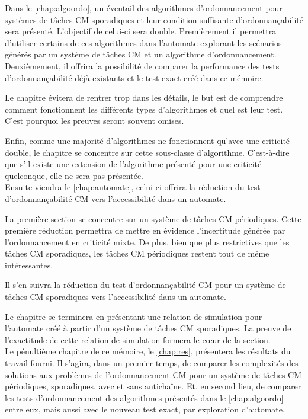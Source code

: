 \documentclass[12pt,a4paper,oneside]{book}
\theoremstyle{break}
\theoremstyle{breakplain}
\begin{document}
Dans le \autoref{chap:algoordo}, un éventail des algorithmes d'ordonnancement pour systèmes de tâches CM sporadiques et leur condition suffisante d'ordonnançabilité sera présenté. L'objectif de celui-ci sera double. Premièrement il permettra d'utiliser certains de ces algorithmes dans l'automate explorant les scénarios générés par un système de tâches CM et un algorithme d'ordonnancement. Deuxièmement, il offrira la possibilité de comparer la performance des tests d'ordonnançabilité déjà existants et le test exact créé dans ce mémoire.

Le chapitre évitera de rentrer trop dans les détails, le but est de comprendre comment fonctionnent les différents types d'algorithmes et quel est leur test. C'est pourquoi les preuves seront souvent omises.

Enfin, comme une majorité d'algorithmes ne fonctionnent qu'avec une criticité double, le chapitre se concentre sur cette sous-classe d'algorithme. C'est-à-dire que s'il existe une extension de l'algorithme présenté pour une criticité quelconque, elle ne sera pas présentée.\\

Ensuite viendra le \autoref{chap:automate}, celui-ci offrira la réduction du test d'ordonnançabilité CM vers l'accessibilité dans un automate.

La première section se concentre sur un système de tâches CM périodiques. Cette première réduction permettra de mettre en évidence l'incertitude générée par l'ordonnancement en criticité mixte. De plus, bien que plus restrictives que les tâches CM sporadiques, les tâches CM périodiques restent tout de même intéressantes.

Il s'en suivra la réduction du test d'ordonnançabilité CM pour un système de tâches CM sporadiques vers l'accessibilité dans un automate.

Le chapitre se terminera en présentant une relation de simulation pour l'automate créé à partir d'un système de tâches CM sporadiques. La preuve de l'exactitude de cette relation de simulation formera le cœur de la section.\\

Le pénultième chapitre de ce mémoire, le \autoref{chap:res}, présentera les résultats du travail fourni. Il s'agira, dans un premier temps, de comparer les complexités des solutions aux problèmes de l'ordonnancement CM pour un système de tâches CM périodiques, sporadiques, avec et sans antichaîne. Et, en second lieu, de comparer les tests d'ordonnancement des algorithmes présentés dans le \autoref{chap:algoordo} entre eux, mais aussi avec le nouveau test exact, par exploration d'automate.\\
\end{document}
